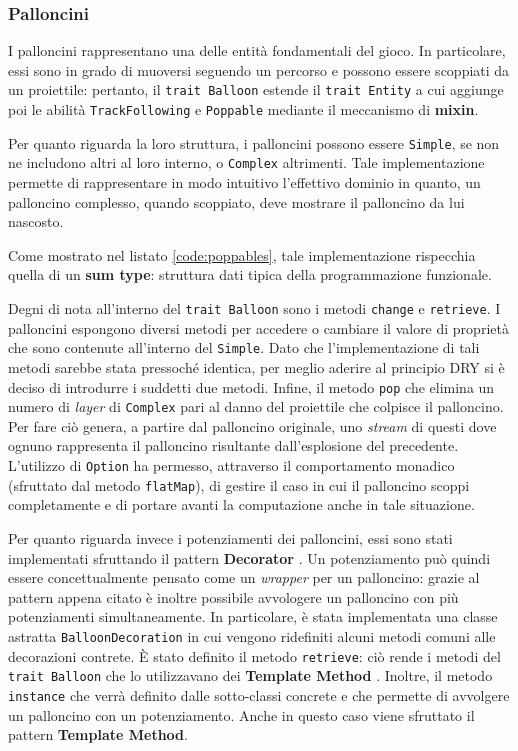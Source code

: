 \subsubsection{Palloncini}
I palloncini rappresentano una delle entità fondamentali del gioco. In particolare, essi sono in grado di muoversi
seguendo un percorso e possono essere scoppiati da un proiettile: pertanto, il \texttt{trait Balloon} estende il
\texttt{trait Entity} a cui aggiunge poi le abilità \texttt{TrackFollowing} e \texttt{Poppable} mediante il meccanismo
di \textbf{mixin}.

Per quanto riguarda la loro struttura, i palloncini possono essere \texttt{Simple}, se non ne includono altri al loro
interno, o \texttt{Complex} altrimenti. Tale implementazione permette di rappresentare in modo intuitivo l'effettivo
dominio in quanto, un palloncino complesso, quando scoppiato, deve mostrare il palloncino da lui nascosto.



Come mostrato nel listato \ref{code:poppables}, tale implementazione rispecchia quella di un \textbf{sum type}: struttura
dati tipica della programmazione funzionale.

Degni di nota all'interno del \texttt{trait Balloon} sono i metodi \texttt{change} e \texttt{retrieve}. I palloncini
espongono diversi metodi per accedere o cambiare il valore di proprietà che sono contenute all'interno del
\texttt{Simple}. Dato che l'implementazione di tali metodi sarebbe stata pressoché identica, per meglio aderire al
principio DRY si è deciso di introdurre i suddetti due metodi.
Infine, il metodo \texttt{pop} che elimina un numero di \textit{layer} di \texttt{Complex} pari al danno del proiettile
che colpisce il palloncino. Per fare ciò genera, a partire dal palloncino originale, uno \textit{stream} di questi dove
ognuno rappresenta il palloncino risultante dall'esplosione del precedente. L'utilizzo di \texttt{Option} ha permesso,
attraverso il comportamento monadico (sfruttato dal metodo \texttt{flatMap}), di gestire il caso in cui il palloncino
scoppi completamente e di portare avanti la computazione anche in tale situazione.



Per quanto riguarda invece i potenziamenti dei palloncini, essi sono stati implementati sfruttando il pattern
\textbf{Decorator} \cite{gof}. Un potenziamento può quindi essere concettualmente pensato come un \textit{wrapper} per un
palloncino: grazie al pattern appena citato è inoltre possibile avvologere un palloncino con più potenziamenti
simultaneamente. In particolare, è stata implementata una classe astratta \texttt{BalloonDecoration} in cui vengono
ridefiniti alcuni metodi comuni alle decorazioni contrete. È stato definito il metodo \texttt{retrieve}: ciò rende i
metodi del \texttt{trait Balloon} che lo utilizzavano dei \textbf{Template Method} \cite{gof}. Inoltre, il metodo
\texttt{instance} che verrà definito dalle sotto-classi concrete e che permette di avvolgere un palloncino con un
potenziamento. Anche in questo caso viene sfruttato il pattern \textbf{Template Method}.

